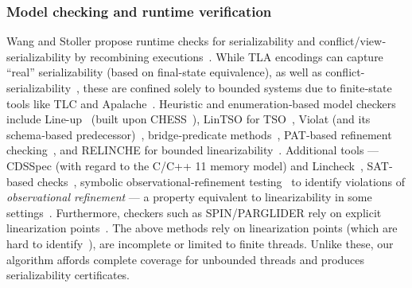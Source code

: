 \subsubsection{Model checking and runtime verification}

Wang and Stoller propose runtime checks for serializability and conflict/view‐serializability by recombining executions~\cite{WaSt06a,WaSt06b}. 
While TLA encodings can capture ``real'' serializability (based on final-state 
equivalence), as well as conflict-serializability~\cite{CoOlPnTuZu07}, these are confined solely to bounded systems due to finite‐state tools like TLC and Apalache~\cite{YuMaLa99,KoKuTr19}. Heuristic and enumeration‐based model checkers include Line-up~\cite{BuDeMuTa10} (built upon CHESS~\cite{MuQaBaBaNaNe08}), LinTSO for TSO~\cite{BuGoMuYa12}, Violat (and its schema‐based predecessor)~\cite{EmEn19,EmEn18}, bridge‐predicate methods~\cite{BuNeSe11,BuSe09}, PAT‐based refinement checking~\cite{LiChLiSuZhDo12,SuLuDoPa09,LiChLiSu09,Zh11}, and RELINCHE for bounded linearizability~\cite{GoKoVa25}. Additional tools --- CDSSpec (with regard to the C/C++ 11 memory model) and Lincheck~\cite{KoDeSoTsAl23,OuDe17}, SAT‐based checks~\cite{BuAlMa07}, symbolic observational‐refinement testing~\cite{EmEnHa15} to identify violations of \textit{observational refinement} --- a property equivalent to linearizability in some settings~\cite{FiOhRiYa10, 
	BoEmCoHa15}.
Furthermore, checkers such as SPIN/PARGLIDER rely on explicit linearization points~\cite{Fl04, VeYaYo09,Ho97,VeYa08}.
 The above methods rely on linearization points (which are hard to identify~\cite{VeYaYo09}), are incomplete or limited to finite threads. 
 Unlike these, our algorithm affords complete coverage for unbounded threads and produces serializability certificates.



